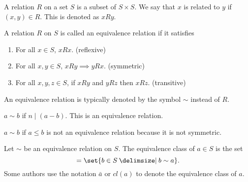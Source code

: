 \documentclass[11pt]{penrose}
\newcommand{\keyword}[1]{\textsf{#1}}
\begin{document}
\begin{ndfn}
    A \keyword{relation} $R$ on a set $S$ is a subset of $S \times S$. We say that $x$ is related to $y$ if $(x,y) \in R$. This is denoted as $xRy$.
\end{ndfn}

\begin{ndfn}
    A relation $R$ on $S$ is called an \keyword{equivalence relation} if it satisfies
    \begin{enumerate}[label=(\roman*)]
        \item For all $x \in S$, $xRx$. \hfill(\keyword{reflexive})
        \item For all $x, y \in S$, $xRy \implies yRx$. \hfill(\keyword{symmetric})
        \item For all $x, y, z \in S$, if $xRy$ and $yRz$ then $xRz$. \hfill(\keyword{transitive})
    \end{enumerate}
    An equivalence relation is typically denoted by the symbol $\sim$ instead of $R$.
\end{ndfn}

\begin{negg}
    $a \sim b$ if $n \mid (a-b)$. This is an equivalence relation.
\end{negg}

\begin{negg}
    $a \sim b$ if $a \leq b$ is not an equivalence relation because it is not symmetric.
\end{negg}

\begin{ndfn}
    Let $\sim$ be an equivalence relation on $S$. The equivalence class of $a \in S$ is the set
    \begin{equation*}
        [a] = \set{b \in S \st b \sim a}.
    \end{equation*}
    Some authors use the notation $\bar{a}$ or $cl(a)$ to denote the equivalence class of $a$.
\end{ndfn}
\end{document}
